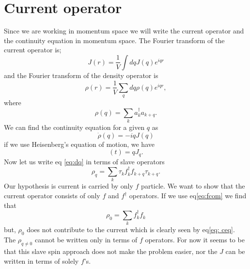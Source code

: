 \documentclass[]{article}
\begin{document}
   \section{Current operator}
   Since we are working in momentum space we will write the current operator and the continuity equation in momentum space. The Fourier transform of the current operator  is;
   \begin{equation}
   J(r)=\frac{1}{V}\int dq J(q)e^{iqr} 
   \end{equation}
   and the Fourier transform of the density operator is 
   \begin{equation}
      \rho(r)=\frac{1}{V}\sum_{q} dq \rho(q)e^{iqr},
   \end{equation}
   where 
   \begin{equation}
   \rho(q)=\sum_{k}a^{\dagger}_k a_{k+q} \label{eq:dq}.
   \end{equation}
   We can find the continuity equation for a given $q$ as 
   \begin{equation}
      \dot{\rho}(q)=-iqJ(q) \label{eq: ceq}
    \end{equation}
    if we use  Heisenberg's equation of motion, we have
    \begin{equation}
    [H,\rho_q](t)=q J_q.
    \end{equation}
Now let us  write   eq \ref{eq:dq} in terms of slave operators 
    \begin{equation}
    \rho_q=\sum_{k}\tau_{k}f^\dagger_{k}f_{k+q}\tau_{k+q}.
    \end{equation}
    Our hypothesis is current is carried by only $f$ particle. We want to show that the current operator consists of only $f$ and $f^\dagger$ operators.
     If we use eq\ref{eq:fcom} we find that 
         \begin{equation}
         \rho_0=\sum_{k}f^\dagger_{k}f_{k}
         \end{equation}
         but, $\rho_0$ does not contribute to the current which is clearly seen  by eq\ref{eq: ceq}. The $\rho_{q\neq0}$ cannot be written only in terms of  $f$ operators. For now it seems to be that this slave spin approach does not make the problem easier, nor the $J$ can be written in terms of solely $f$'s.
    
\end{document}
